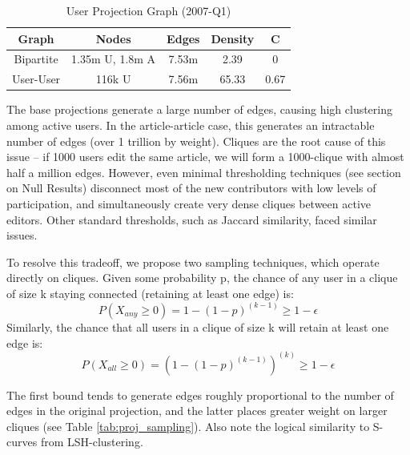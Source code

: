 \documentclass[letterpaper, 12pt, conference]{ieeeconf}
\begin{document}
\begin{table}[ht]
    \centering
    \label{tab:uu_proj_stats}
    \caption{User Projection Graph (2007-Q1)}
    \begin{tabular}{c|c|c|c|c}
        \toprule
        Graph & Nodes & Edges & Density & C \\
         \midrule
        Bipartite & 1.35m U, 1.8m A & 7.53m & 2.39 & 0 \\
        User-User & 116k U & 7.56m & 65.33 & 0.67 \\
         \bottomrule
    \end{tabular}
\end{table}

The base projections generate a large number of edges, causing high clustering among active users. In the article-article case, this generates an intractable number of edges (over 1 trillion by weight). Cliques are the root cause of this issue -- if 1000 users edit the same article, we will form a 1000-clique with almost half a million edges. However, even minimal thresholding techniques (see section on Null Results) disconnect most of the new contributors with low levels of participation, and simultaneously create very dense cliques between active editors. Other standard thresholds, such as Jaccard similarity, faced similar issues.

To resolve this tradeoff, we propose two sampling techniques, which operate directly on cliques. Given some probability p, the chance of any user in a clique of size k staying connected (retaining at least one edge) is:
\begin{equation}
    P(X_{any} \geq 0) 
    = 1 - (1-p)^{(k-1)} 
    \geq 1 - \epsilon
\end{equation}
Similarly, the chance that all users in a clique of size k will retain at least one edge is:
\begin{equation}
    P(X_{all} \geq 0)
    = (1-(1-p)^{(k-1)})^{(k)}
    \geq 1 - \epsilon
\end{equation}

The first bound tends to generate edges roughly proportional to the number of edges in the original projection, and the latter places greater weight on larger cliques (see Table \ref{tab:proj_sampling}). Also note the logical similarity to S-curves from LSH-clustering.\cite{leskovec2014mining}
\end{document}
